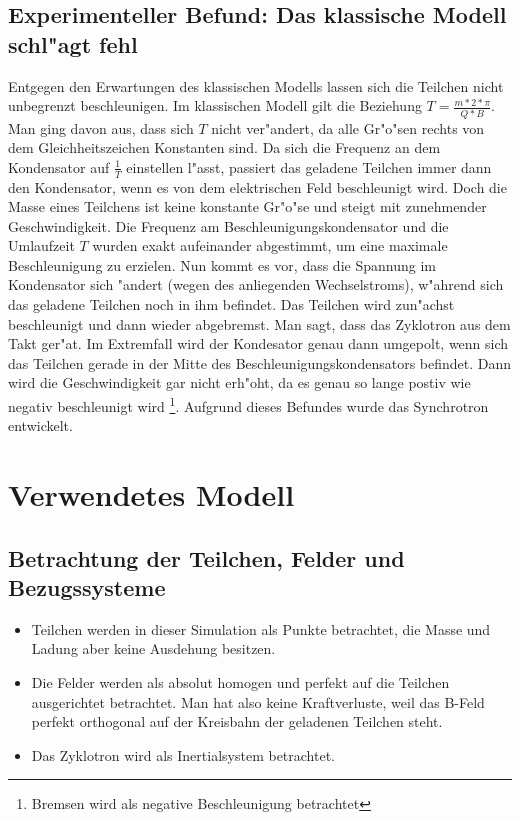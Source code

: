 \documentclass[14pt, a4paper]{report}
\begin{document}
\section{Experimenteller Befund: Das klassische Modell schl"agt fehl}
Entgegen den Erwartungen des klassischen Modells
lassen sich die Teilchen nicht unbegrenzt beschleunigen. Im klassischen Modell
gilt die Beziehung $T = \frac{m * 2 * \pi }{Q * B}$.
Man ging davon aus, dass sich $T$ nicht ver"andert, da alle Gr"o"sen rechts von dem 
Gleichheitszeichen Konstanten sind. Da sich die Frequenz an dem Kondensator auf
$\frac{1}{T}$ einstellen l"asst, passiert das geladene Teilchen immer dann den Kondensator,
wenn es von dem elektrischen Feld beschleunigt wird. Doch die Masse eines Teilchens
ist keine konstante Gr"o"se  und steigt mit zunehmender 
Geschwindigkeit. Die Frequenz am Beschleunigungskondensator und die Umlaufzeit $T$ 
wurden
exakt aufeinander abgestimmt, um eine maximale Beschleunigung zu erzielen.
Nun kommt es vor, dass die Spannung im Kondensator sich "andert (wegen des anliegenden Wechselstroms), 
w"ahrend sich das 
geladene Teilchen noch in ihm befindet. Das Teilchen wird zun"achst beschleunigt und
dann wieder abgebremst. Man sagt, dass das Zyklotron aus dem Takt ger"at.
Im Extremfall wird der Kondesator genau dann umgepolt, wenn sich das 
Teilchen gerade in der Mitte des Beschleunigungskondensators befindet. Dann wird die 
Geschwindigkeit gar nicht erh"oht, da es genau so lange postiv wie negativ beschleunigt 
wird \footnote{Bremsen wird als negative Beschleunigung betrachtet}.
Aufgrund dieses Befundes wurde das Synchrotron entwickelt.

\chapter{Verwendetes Modell}
\section{Betrachtung der Teilchen, Felder und Bezugssysteme}
\begin{itemize}
\item Teilchen werden in dieser Simulation als Punkte betrachtet, die Masse und Ladung aber keine 
Ausdehung besitzen.
\item Die Felder werden als absolut homogen und perfekt auf die Teilchen ausgerichtet
betrachtet. Man hat also keine Kraftverluste, weil das B-Feld perfekt
orthogonal auf der Kreisbahn der geladenen Teilchen steht.
\item Das Zyklotron wird als Inertialsystem betrachtet.
\end{itemize}
\end{document}
